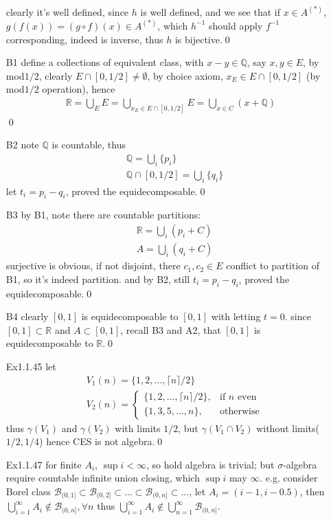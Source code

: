 \documentclass[paper=a4, fontsize=11pt]{scrartcl} %
\numberwithin{equation}{section} %
\numberwithin{figure}{section} %
\numberwithin{table}{section} %
\begin{document}
\begin{itemize}
\begin{align}
	 \end{align}
	 clearly it's well defined, since $h$ is well defined, and we see that if $x\in A^{(*)}$, $g(f(x)) = (g\circ f)(x) \in A^{(*)}$, which $h^{-1}$ should apply $f^{-1}$ corresponding, indeed is inverse, thus $h$ is bijective.\qed
	 \item[B1] define a collections of equivalent class, with $x-y\in \mathbb{Q}$, say $x,y\in E$, by mod$1/2$, clearly $E\cap [0,1/2]\neq \emptyset$, by choice axiom, $x_E\in E\cap [0,1/2]$ (by mod$1/2$ operation), hence
	 \begin{align}
	 	\mathbb{R} = \bigcup_{E} E = \bigcup_{x_E\in E\cap [0,1/2]} E = \bigcup_{x\in C}(x+\mathbb{Q})
	 \end{align}\qed
	 \item[B2] note $\mathbb{Q}$ is countable, thus
	 \begin{align}
	 	&\mathbb{Q} = \bigcup_i \{p_i\} \\
	 	&\mathbb{Q}\cap [0,1/2] = \bigcup_i \{q_i\}
	 \end{align}
	 let $t_i = p_i-q_i$, proved the equidecomposable.\qed
	 \item[B3] by B1, note there are countable partitions:
	 \begin{align}
	 	&\mathbb{R}  =  \bigcup_i (p_i + C)\\
	 	&A = \bigcup_i(q_i+C)
	 \end{align}
	 surjective is obvious, if not disjoint, there $c_1,c_2\in E$ conflict to partition of B1, so it's indeed partition. and by B2, still $t_i=p_i-q_i$, proved the equidecomposable.\qed
	 \item[B4] clearly $[0,1]$ is equidecomposable to $[0,1]$ with letting $t=0$. since $[0,1]\subset \mathbb{R}$ and $A\subset [0,1]$, recall B3 and A2, that $[0,1]$ is equidecomposable to $\mathbb{R}$.\qed
	 \item[Ex1.1.45] let 
	 \begin{align}
	 	&V_1(n) = \{1,2,...,\lceil n \rceil/2\}\\
	 	&V_2(n) = \begin{cases} \{1,2,...,\lceil n \rceil/2\}, &\mbox{if $n$ even}\\
	 		\{1,3,5,...,n\}, &\mbox{otherwise}\end{cases}
	 \end{align}
	 thus $\gamma(V_1)$ and $\gamma(V_2)$ with limits $1/2$, but $\gamma(V_1\cap V_2)$ without limits($1/2,1/4$) hence CES is not algebra.\qed
	 \item[Ex1.1.47] for finite $A_i$, $\sup i<\infty$, so hold algebra is trivial; but $\sigma$-algebra require countable infinite union closing, which $\sup i$ may $\infty$. e.g. consider Borel class $\mathcal{B}_{(0,1]}\subset\mathcal{B}_{(0,2]}\subset...\subset\mathcal{B}_{(0,n]}\subset...$, let $A_i=(i-1, i-0.5)$, then $\bigcup_{i=1}^\infty A_i\notin \mathcal{B}_{(0,n]},\forall n$ thus $\bigcup_{i=1}^\infty A_i\notin \bigcup_{n=1}^\infty \mathcal{B}_{(0,n]}$.

\end{itemize}
\end{document}
